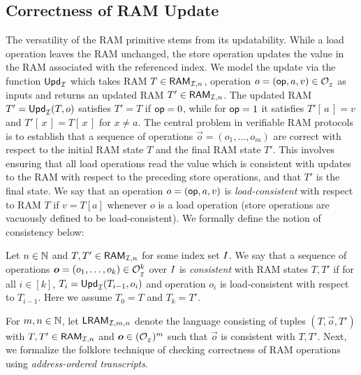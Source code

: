 \subsection{Correctness of RAM Update}\label{subsec:ram-update}
The versatility of the RAM primitive stems from its updatability. While a load operation leaves the RAM unchanged, the store operation
updates the value in the RAM associated with the referenced index. We model the update via the function
$\mathsf{Upd}_{\mathcal{I}}$ which takes RAM $T\in \mathsf{RAM}_{\mathcal{I}, {n}}$, operation
$o=(\mathsf{op},a,v)\in \mathcal{O}_{{}_\mathcal{I}}$ as inputs and returns an updated RAM $T'\in \mathsf{RAM}_{\mathcal{I}, {n}}$.
The updated RAM $T'=\mathsf{Upd}_{\mathcal{I}}(T,o)$ satisfies
$T'=T$ if $\mathsf{op}=0$, while for $\mathsf{op}=1$ it satisfies $T'[\,a\,]=v$  and $T'[\,x\,]=T[\,x\,]$ for $x\neq a$. The central problem
in verifiable RAM protocols is to establish that a sequence of operations $\vec{o}=(o_1,\ldots,o_m)$ are correct with
respect to the initial RAM state $T$ and the final RAM state $T'$. This involves ensuring
that all load operations read the value which is consistent with updates to the RAM with respect to the preceding
store operations, and that $T'$ is the final state. We say that an operation $o=(\mathsf{op},a,v)$ is {\em load-consistent}
with respect to RAM $T$ if $v=T[a]$ whenever $o$ is a load operation (store operations are vacuously defined to be load-consistent).
We formally define the notion of consistency below:

\begin{definition}\label{defn:consistent-operations}
    Let $n\in \mathbb{N}$ and $T,T'\in \mathsf{RAM}_{\mathcal{I}, {n}}$ for some index set $I$. We say that a sequence of operations
    $\vec{o}=(o_1,\ldots,o_k)\in \RAMOp{I}^k$ over $I$ is {\em consistent} with RAM states
    $T,T'$ if for all $i\in [k]$, $T_{i}=\mathsf{Upd}_{\mathcal{I}}(T_{i-1},o_i)$ and operation $o_i$ is load-consistent with respect to $T_{i-1}$. Here
    we assume $T_0=T$ and $T_k=T'$.
\end{definition}

For $m,n\in \mathbb{N}$, let $\mathsf{LRAM}_{\mathcal{I},m,n}$ denote the language consisting of tuples $(T,\vec{o},T')$ with $T,T'\in \mathsf{RAM}_{\mathcal{I}, {n}}$ and $\vec{o}\in (\RAMOp{I})^m$
such that $\vec{o}$ is consistent with $T,T'$.
Next, we formalize the folklore technique of checking correctness of RAM operations
using {\em address-ordered transcripts}.


